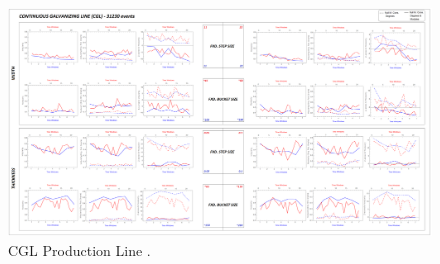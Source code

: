 \begin{landscape}
\begin{figure}[ht]
	\centering
	\hspace*{-1.3cm}
	\captionsetup{width=1.1\linewidth}
	\includegraphics[width=1.6\textwidth]{../images/supplements-CGL_real_life_events_analysis-results-curves_and_time_resolutions.png}
	\caption{CGL Production Line \cc{} \dd{}.}
	\label{figure-supplements-CGL-curveplots_sliding}
\end{figure}
\end{landscape}
